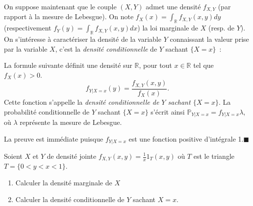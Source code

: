 On suppose maintenant que le couple \((X,Y)\) admet une densité
\(f_{X,Y}\) (par rapport à la mesure de Lebesgue). On note
\(f_X(x) = \int_\mathbb{R}f_{X,Y}(x,y)dy\) (respectivement
\(f_Y(y) = \int_\mathbb{R}f_{X,Y}(x,y)dx\)) la loi marginale de \(X\)
(resp. de \(Y\)). On s'intéresse à caractériser la densité de la
variable \(Y\) connaissant la valeur prise par la variable \(X\), c'est
la \emph{densité conditionnelle} de \(Y\) sachant \(\{X = x\}\)~:

\begin{proposition}\label{III-defdenscond}

La formule suivante définit une densité sur \(\mathbb{R}\), pour tout
\(x \in \mathbb{R}\) tel que \(f_X(x) > 0\).
\[ f_{Y|X=x}(y) = \frac{f_{X,Y}(x,y)}{f_X(x)}.\] Cette fonction
s'appelle la \emph{densité conditionnelle de \(Y\) sachant
\(\{X = x\}\)}. La probabilité conditionnelle de \(Y\) sachant
\(\{X = x\}\) s'écrit ainsi \(\mathbb{P}_{Y|X=x} = f_{Y|X=x}\lambda\),
où \(\lambda\) représente la mesure de Lebesgue.
\end{proposition}

\begin{preuve}
La preuve est immédiate puisque \(f_{Y|X=x}\) est une fonction positive
d'intégrale 1.\hfill$\blacksquare$
\end{preuve}

\label{III-etb1}
Soient \(X\) et \(Y\) de densité jointe
\(f_{X,Y}(x,y)= \frac{1}{x}1_T (x,y)\) où \(T\) est le triangle
\(T = \{0< y< x < 1\}\).

\begin{enumerate}
\def\labelenumi{\arabic{enumi}.}
\tightlist
\item
  Calculer la densité marginale de \(X\)
\item
  Calculer la densité conditionnelle de \(Y\) sachant \(X=x\).
\end{enumerate}


